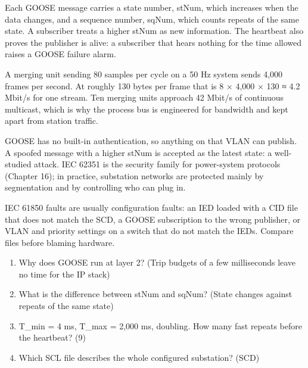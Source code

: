  Each GOOSE message carries a state number, stNum, which increases when the data changes, and a sequence number, sqNum, which counts repeats of the same state. A subscriber treats a higher stNum as new information. The heartbeat also proves the publisher is alive: a subscriber that hears nothing for the time allowed raises a GOOSE failure alarm.

 A merging unit sending 80 samples per cycle on a 50 Hz system sends 4,000 frames per second. At roughly 130 bytes per frame that is 8 × 4,000 × 130 ≈ 4.2 Mbit/s for one stream. Ten merging units approach 42 Mbit/s of continuous multicast, which is why the process bus is engineered for bandwidth and kept apart from station traffic.

GOOSE has no built-in authentication, so anything on that VLAN can publish. A spoofed message with a higher stNum is accepted as the latest state: a well-studied attack. IEC 62351 is the security family for power-system protocols (Chapter 16); in practice, substation networks are protected mainly by segmentation and by controlling who can plug in.

\onsite IEC 61850 faults are usually configuration faults: an IED loaded with a CID file that does not match the SCD, a GOOSE subscription to the wrong publisher, or VLAN and priority settings on a switch that do not match the IEDs. Compare files before blaming hardware.

\begin{enumerate}
\item Why does GOOSE run at layer 2? (Trip budgets of a few milliseconds leave no time for the IP stack)
\item What is the difference between stNum and sqNum? (State changes against repeats of the same state)
\item T\_min = 4 ms, T\_max = 2,000 ms, doubling. How many fast repeats before the heartbeat? (9)
\item Which SCL file describes the whole configured substation? (SCD)
\end{enumerate}
